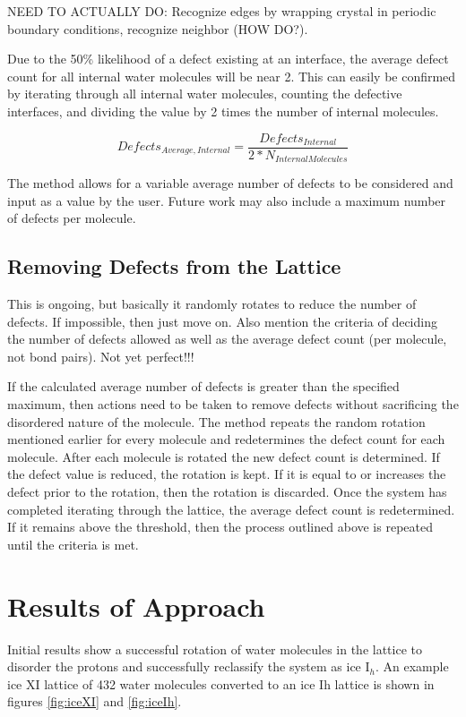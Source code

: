 NEED TO ACTUALLY DO: Recognize edges by wrapping crystal in periodic boundary conditions, recognize neighbor (HOW DO?).

Due to the 50\% likelihood of a defect existing at an interface, the average defect count for all internal water molecules will be near 2. 
This can easily be confirmed by iterating through all internal water molecules, counting the defective interfaces, and dividing the value by 2 times the number of internal molecules.


\begin{equation}
Defects_{Average, Internal} = \frac{Defects_{Internal}}{2*N_{Internal Molecules}}
\end{equation}

The method allows for a variable average number of defects to be considered and input as a value by the user. Future work may also include a maximum number of defects per molecule.

\subsection{Removing Defects from the Lattice}
This is ongoing, but basically it randomly rotates to reduce the number of defects. 
If impossible, then just move on. 
Also mention the criteria of deciding the number of defects allowed as well as the average defect count (per molecule, not bond pairs). 
Not yet perfect!!!

If the calculated average number of defects is greater than the specified maximum, then actions need to be taken to remove defects without sacrificing the disordered nature of the molecule. 
The method repeats the random rotation mentioned earlier for every molecule and redetermines the defect count for each molecule. 
After each molecule is rotated the new defect count is determined. 
If the defect value is reduced, the rotation is kept. 
If it is equal to or increases the defect prior to the rotation, then the rotation is discarded. 
Once the system has completed iterating through the lattice, the average defect count is redetermined. 
If it remains above the threshold, then the process outlined above is repeated until the criteria is met.

\section{Results of Approach}
Initial results show a successful rotation of water molecules in the lattice to disorder the protons and successfully reclassify the system as ice I$_{h}$. 
An example ice XI lattice of 432 water molecules converted to an ice Ih lattice is shown in figures \ref{fig:iceXI} and \ref{fig:iceIh}.

